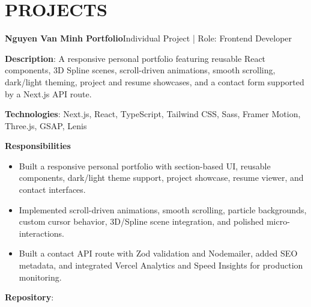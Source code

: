 \section{PROJECTS}
\resumeSubHeadingListStart

  \resumeProjectHeading
    {\textbf{Nguyen Van Minh Portfolio}}{Individual Project | Role: Frontend Developer}
    \resumeItemListStart
      \item \textbf{Description}: A responsive personal portfolio featuring reusable React components, 3D Spline scenes, scroll-driven animations, smooth scrolling, dark/light theming, project and resume showcases, and a contact form supported by a Next.js API route.
      \item \textbf{Technologies}: Next.js, React, TypeScript, Tailwind CSS, Sass, Framer Motion, Three.js, GSAP, Lenis
      \item \textbf{Responsibilities}
        \begin{itemize}
          \item Built a responsive personal portfolio with section-based UI, reusable components, dark/light theme support, project showcase, resume viewer, and contact interfaces.
          \item Implemented scroll-driven animations, smooth scrolling, particle backgrounds, custom cursor behavior, 3D/Spline scene integration, and polished micro-interactions.
          \item Built a contact API route with Zod validation and Nodemailer, added SEO metadata, and integrated Vercel Analytics and Speed Insights for production monitoring.
        \end{itemize}
      \item \textbf{Repository}: \href{https://github.com/nvminh162/nguyenvanminh-portfolio-web}{}
    \resumeItemListEnd

